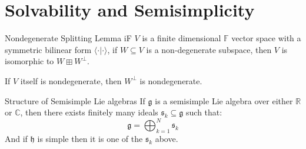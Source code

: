 \documentclass[crop=false,class=article]{standalone}                           %
\begin{document}
    \section{Solvability and Semisimplicity}
        \begin{ltheorem}{Nondegenerate Splitting Lemma}{}
            iF $V$ is a finite dimensional $\mathbb{F}$ vector space with a
            symmetric bilinear form $\langle\cdot|\cdot\rangle$, if
            $W\subseteq{V}$ is a non-degenerate subspace, then
            $V$ is isomorphic to $W\boxplus{W}^{\perp}$.
        \end{ltheorem}
        If $V$ itself is nondegenerate, then $W^{\perp}$ is nondegenerate.
        \begin{ltheorem}{Structure of Semisimple Lie algebras}{}
            If $\mathfrak{g}$ is a semisimple Lie algebra over either
            $\mathbb{R}$ or $\mathbb{C}$, then there exists finitely many ideals
            $\mathfrak{s}_{k}\subseteq\mathfrak{g}$ such that:
            \begin{equation}
                \mathfrak{g}=\bigoplus_{k=1}^{N}\mathfrak{s}_{k}
            \end{equation}
            And if $\mathfrak{h}$ is simple then it is one of the
            $\mathfrak{s}_{k}$ above.
        \end{ltheorem}
\end{document}
